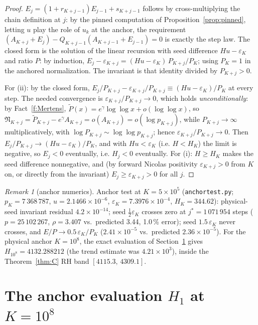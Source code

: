 \documentclass[11pt]{article}
\theoremstyle{remark}
\newtheorem{remark}[theorem]{Remark}
\newcommand{\uk}{u_k}
\newcommand{\eps}{\varepsilon}
\newcommand{\Nn}{\mathfrak{N}}
\newcommand{\Ptil}{\widetilde P}
\newcommand{\gam}{\gamma}
\begin{document}
\begin{proof}
$E_j=(1+r_{K+j-1})E_{j-1}+s_{K+j-1}$ follows by cross-multiplying the chain
definition at $j$: by the pinned computation of Proposition~\ref{prop:pinned},
letting $u$ play the role of $\uk$ at the anchor, the requirement
$(A_{K+j}+E_j)-Q_{K+j-1}(A_{K+j-1}+E_{j-1})=0$ is exactly the step law.
The closed form is the solution of the linear recursion with seed difference
$Hu-\eps_K$ and ratio $P$: by induction,
$E_j-\eps_{K+j}=(Hu-\eps_K)\,P_{K+j}/P_K$; using $P_K=1$ in the anchored
normalization. The invariant is that identity divided by $P_{K+j}>0$.

For (ii): by the closed form,
$E_j/P_{K+j}-\eps_{K+j}/P_{K+j}\equiv(Hu-\eps_K)/P_K$ at every step. The needed
convergence is $\eps_{K+j}/P_{K+j}\to0$, which holds \emph{unconditionally}: by
Fact~\ref{f:Mertens}, $\Ptil(x)=e^\gam\log\log x+o(\log\log x)$, so
$\Nn_{K+j}=\Ptil_{K+j}-e^\gam A_{K+j}=o(A_{K+j})=o(\log p_{K+j})$, while
$P_{K+j}\to\infty$ multiplicatively, with $\log P_{K+j}\sim\log\log p_{K+j}$; hence
$\eps_{K+j}/P_{K+j}\to0$. Then $E_j/P_{K+j}\to(Hu-\eps_K)/P_K$, and
with $Hu<\eps_K$ (i.e. $H<H_K$) the limit is negative, so $E_j<0$ eventually, i.e.
$H_j<0$ eventually. For (i): $H\ge H_K$ makes the seed difference
nonnegative, and (by forward Nicolas positivity $\eps_{K+j}>0$ from $K$ on, or
directly from the invariant) $E_j\ge\eps_{K+j}>0$ for all $j$.
\end{proof}

\begin{remark}[anchor numerics]\label{rem:anchor}
Anchor test at $K=5\times10^5$ (\texttt{anchortest.py};
$p_K=7\,368\,787$, $u=2.1466\times10^{-6}$, $\eps_K=7.3976\times10^{-4}$,
$H_K=344.62$): physical-seed invariant residual $4.2\times10^{-14}$; seed
$\tfrac12\eps_K$ crosses zero at $j^*=1\,071\,954$ steps
($p=25\,102\,267$, $\rho=3.407$ vs.\ predicted 3.44, 1.0\,\% error); seed
$1.5\,\eps_K$ never crosses, and $E/P\to0.5\,\eps_K/P_K$
($2.41\times10^{-5}$ vs.\ predicted $2.36\times10^{-5}$). For the physical
anchor $K=10^8$, the exact evaluation of Section~\ref{sec:h1} gives
$H_{10^8}=4132.288212$ (the trend estimate was $4.21\times10^{3}$), inside
the Theorem~\ref{thm:C} RH band $[4115.3,\,4309.1]$.
\end{remark}

\section{The anchor evaluation $H_1$ at $K=10^8$}\label{sec:h1}
\end{document}
